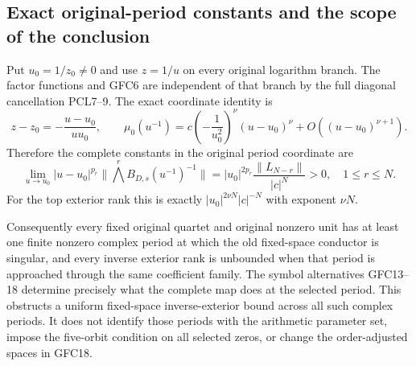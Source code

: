 \documentclass[11pt]{article}
\begin{document}
\subsection{Exact original-period constants and the scope of the conclusion}
Put $u_0=1/z_0\ne0$ and use $z=1/u$ on every original logarithm
branch. The factor functions and GFC6 are independent of that branch
by the full diagonal cancellation PCL7--9. The exact coordinate identity is
\[
 z-z_0=-\frac{u-u_0}{u u_0},\qquad
 \mu_0(u^{-1})=
       c\left(-\frac1{u_0^2}\right)^\nu
                  (u-u_0)^\nu+O((u-u_0)^{\nu+1}).
 \tag{GFC20}
\]
Therefore the complete constants in the original period coordinate are
\[
 \boxed{\quad
 \lim_{u\to u_0}|u-u_0|^{p_r}
       \|\bigwedge^rB_{D,s}(u^{-1})^{-1}\|
   =|u_0|^{2p_r}\frac{\|L_{N-r}\|}{|c|^N}>0,
 \quad 1\le r\le N.
 \quad}\tag{GFC21}
\]
For the top exterior rank this is exactly
$|u_0|^{2\nu N}|c|^{-N}$ with exponent $\nu N$.

Consequently every fixed original quartet and original nonzero unit
has at least one finite nonzero complex period at which the old
fixed-space conductor is singular, and every inverse exterior rank
is unbounded when that period is approached through the same
coefficient family. The symbol alternatives GFC13--18 determine
precisely what the complete map does at the selected period.
This obstructs a uniform fixed-space inverse-exterior bound across
all such complex periods. It does not identify those periods with
the arithmetic parameter set, impose the five-orbit condition on
all selected zeros, or change the order-adjusted spaces in GFC18.
\end{document}
